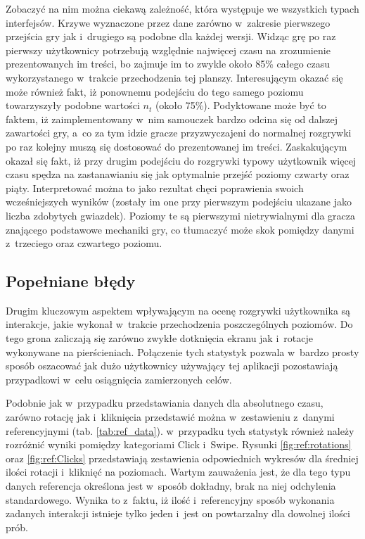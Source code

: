 \documentclass[a4paper,12pt,numbers=noenddot]{report}
\begin{document}
Zobaczyć na nim można ciekawą zależność, która występuje we wszystkich typach interfejsów. Krzywe wyznaczone przez dane zarówno w~zakresie pierwszego przejścia gry jak i~drugiego są podobne dla każdej wersji. Widząc grę po raz pierwszy użytkownicy potrzebują względnie najwięcej czasu na zrozumienie prezentowanych im treści, bo zajmuje im to zwykle około 85\% całego czasu wykorzystanego w~trakcie przechodzenia tej planszy. Interesującym okazać się może również fakt, iż ponownemu podejściu do tego samego poziomu towarzyszyły podobne wartości $n_{t}$ (około 75\%). Podyktowane może być to faktem, iż zaimplementowany w~nim samouczek bardzo odcina się od dalszej zawartości gry, a~co za tym idzie gracze przyzwyczajeni do normalnej rozgrywki po raz kolejny muszą się dostosować do prezentowanej im treści.
Zaskakującym okazał się fakt, iż przy drugim podejściu do rozgrywki typowy użytkownik więcej czasu spędza na zastanawianiu się jak optymalnie przejść poziomy czwarty oraz piąty. Interpretować można to jako rezultat chęci poprawienia swoich wcześniejszych wyników (zostały im one przy pierwszym podejściu ukazane jako liczba zdobytych gwiazdek). Poziomy te są pierwszymi nietrywialnymi dla gracza znającego podstawowe mechaniki gry, co tłumaczyć może skok pomiędzy danymi z~trzeciego oraz czwartego poziomu. \\

\subsection{Popełniane błędy}
Drugim kluczowym aspektem wpływającym na ocenę rozgrywki użytkownika są interakcje, jakie wykonał w~trakcie przechodzenia poszczególnych poziomów. Do tego grona zaliczają się zarówno zwykłe dotknięcia ekranu jak i~rotacje wykonywane na pierścieniach. Połączenie tych statystyk pozwala w~bardzo prosty sposób oszacować jak dużo użytkownicy używający tej aplikacji pozostawiają przypadkowi w~celu osiągnięcia zamierzonych celów. 

Podobnie jak w~przypadku przedstawiania danych dla absolutnego czasu, zarówno rotację jak i~kliknięcia przedstawić można w~zestawieniu z~danymi referencyjnymi (tab. \ref{tab:ref_data}). w~przypadku tych statystyk również należy rozróżnić wyniki pomiędzy kategoriami Click i~Swipe. Rysunki
\ref{fig:ref:rotations} oraz \ref{fig:ref:Clicks} przedstawiają zestawienia odpowiednich wykresów dla średniej ilości rotacji i~kliknięć na poziomach. Wartym zauważenia jest, że dla tego typu danych referencja określona jest w~sposób dokładny, brak na niej odchylenia standardowego. Wynika to z~faktu, iż ilość i~referencyjny sposób wykonania zadanych interakcji istnieje tylko jeden i~jest on powtarzalny dla dowolnej ilości prób.
\end{document}
